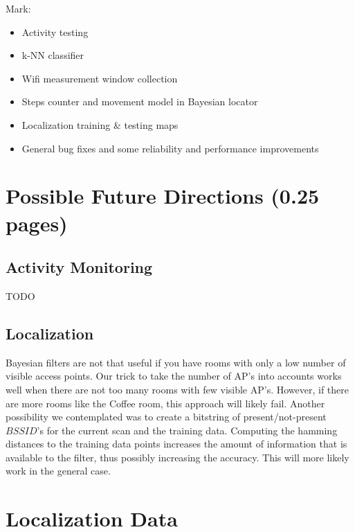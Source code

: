 \documentclass[a4paper,10pt,twoside]{IEEEtran}
\begin{document}
Mark:
\begin{itemize}
    \item Activity testing
    \item k-NN classifier
    \item Wifi measurement window collection
    \item Steps counter and movement model in Bayesian locator
    \item Localization training \& testing maps
    \item General bug fixes and some reliability and performance improvements
\end{itemize}

\section{Possible Future Directions (0.25 pages)}
\label{sec:future-directions}
\subsection{Activity Monitoring}
TODO

\subsection{Localization}
Bayesian filters are not that useful if you have rooms with only a low number of visible access points.
Our trick to take the number of AP's into accounts works well when there
are not too many rooms with few visible AP's.
However, if there are more rooms like the Coffee room, this approach will likely fail.
Another possibility we contemplated was to create a bitstring of present/not-present $BSSID$'s for the current scan and the training data.
Computing the hamming distances to the training data points increases the amount of information that
is available to the filter, thus possibly increasing the accuracy.
This will more likely work in the general case.

%
%

\newpage
\appendix

%
\section{Localization Data}
\end{document}
